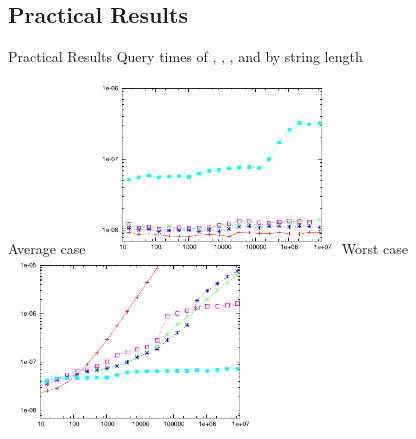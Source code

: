 \documentclass{beamer}
\begin{document}
\subsection{Practical Results}
\begin{frame}{Practical Results}
    Query times of
    \textcolor{red}{},
    \textcolor{green}{\fprint[2]},
    \textcolor{blue}{\fprint[3]},
    \textcolor{magenta}{\fprint[\logceil]} and
    \textcolor{cyan}{}
    by string length
    \begin{multicols}{2}{
        \begin{center}
            Average case
            \includegraphics[width=0.49\textwidth,type=pdf,ext=.pdf,read=.pdf]{../src/results/length-slides-cache-rand10.plt}
            \newpage
            Worst case
            \includegraphics[width=0.49\textwidth,type=pdf,ext=.pdf,read=.pdf]{../src/results/length-slides-cache-alla.plt}
        \end{center}
    }
    \end{multicols}
\end {frame}

\end{document}
